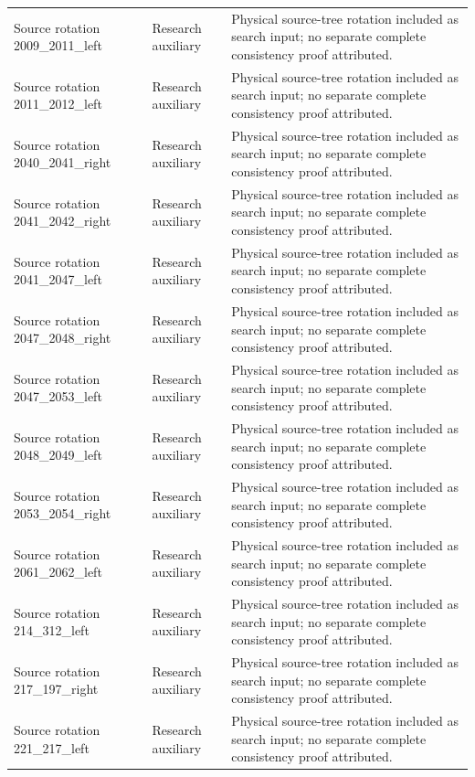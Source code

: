 \begin{longtable}{@{}p{.25\linewidth}p{.17\linewidth}p{.53\linewidth}@{}}
Source rotation 2009\_2011\_left & Research auxiliary & Physical source-tree rotation included as search input; no separate complete consistency proof attributed. \\
Source rotation 2011\_2012\_left & Research auxiliary & Physical source-tree rotation included as search input; no separate complete consistency proof attributed. \\
Source rotation 2040\_2041\_right & Research auxiliary & Physical source-tree rotation included as search input; no separate complete consistency proof attributed. \\
Source rotation 2041\_2042\_right & Research auxiliary & Physical source-tree rotation included as search input; no separate complete consistency proof attributed. \\
Source rotation 2041\_2047\_left & Research auxiliary & Physical source-tree rotation included as search input; no separate complete consistency proof attributed. \\
Source rotation 2047\_2048\_right & Research auxiliary & Physical source-tree rotation included as search input; no separate complete consistency proof attributed. \\
Source rotation 2047\_2053\_left & Research auxiliary & Physical source-tree rotation included as search input; no separate complete consistency proof attributed. \\
Source rotation 2048\_2049\_left & Research auxiliary & Physical source-tree rotation included as search input; no separate complete consistency proof attributed. \\
Source rotation 2053\_2054\_right & Research auxiliary & Physical source-tree rotation included as search input; no separate complete consistency proof attributed. \\
Source rotation 2061\_2062\_left & Research auxiliary & Physical source-tree rotation included as search input; no separate complete consistency proof attributed. \\
Source rotation 214\_312\_left & Research auxiliary & Physical source-tree rotation included as search input; no separate complete consistency proof attributed. \\
Source rotation 217\_197\_right & Research auxiliary & Physical source-tree rotation included as search input; no separate complete consistency proof attributed. \\
Source rotation 221\_217\_left & Research auxiliary & Physical source-tree rotation included as search input; no separate complete consistency proof attributed. \\

\end{longtable}
